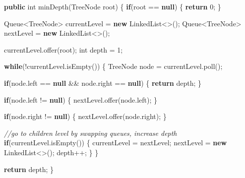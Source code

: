 \documentclass[]{book}
\newenvironment{Shaded}{\begin{snugshade}}{\end{snugshade}}
\newcommand{\BuiltInTok}[1]{#1}
\newcommand{\CommentTok}[1]{\textcolor[rgb]{0.56,0.35,0.01}{\textit{#1}}}
\newcommand{\DataTypeTok}[1]{\textcolor[rgb]{0.13,0.29,0.53}{#1}}
\newcommand{\DecValTok}[1]{\textcolor[rgb]{0.00,0.00,0.81}{#1}}
\newcommand{\FunctionTok}[1]{\textcolor[rgb]{0.00,0.00,0.00}{#1}}
\newcommand{\KeywordTok}[1]{\textcolor[rgb]{0.13,0.29,0.53}{\textbf{#1}}}
\newcommand{\NormalTok}[1]{#1}
\begin{document}
\begin{Shaded}
\begin{Highlighting}[]
\KeywordTok{public} \DataTypeTok{int} \FunctionTok{minDepth}\NormalTok{(}\BuiltInTok{TreeNode}\NormalTok{ root) \{}
    \KeywordTok{if}\NormalTok{(root == }\KeywordTok{null}\NormalTok{) \{}
        \KeywordTok{return} \DecValTok{0}\NormalTok{;}
\NormalTok{    \}}

    \BuiltInTok{Queue}\NormalTok{<}\BuiltInTok{TreeNode}\NormalTok{> currentLevel = }\KeywordTok{new} \BuiltInTok{LinkedList}\NormalTok{<>();}
    \BuiltInTok{Queue}\NormalTok{<}\BuiltInTok{TreeNode}\NormalTok{> nextLevel = }\KeywordTok{new} \BuiltInTok{LinkedList}\NormalTok{<>();}

\NormalTok{    currentLevel.}\FunctionTok{offer}\NormalTok{(root);}
    \DataTypeTok{int}\NormalTok{ depth = }\DecValTok{1}\NormalTok{;}

    \KeywordTok{while}\NormalTok{(!currentLevel.}\FunctionTok{isEmpty}\NormalTok{()) \{}
        \BuiltInTok{TreeNode}\NormalTok{ node = currentLevel.}\FunctionTok{poll}\NormalTok{();}

        \KeywordTok{if}\NormalTok{(node.}\FunctionTok{left}\NormalTok{ == }\KeywordTok{null}\NormalTok{ && node.}\FunctionTok{right}\NormalTok{ == }\KeywordTok{null}\NormalTok{) \{}
            \KeywordTok{return}\NormalTok{ depth;}
\NormalTok{        \}}

        \KeywordTok{if}\NormalTok{(node.}\FunctionTok{left}\NormalTok{ != }\KeywordTok{null}\NormalTok{) \{}
\NormalTok{            nextLevel.}\FunctionTok{offer}\NormalTok{(node.}\FunctionTok{left}\NormalTok{);}
\NormalTok{        \}}

        \KeywordTok{if}\NormalTok{(node.}\FunctionTok{right}\NormalTok{ != }\KeywordTok{null}\NormalTok{) \{}
\NormalTok{            nextLevel.}\FunctionTok{offer}\NormalTok{(node.}\FunctionTok{right}\NormalTok{);}
\NormalTok{        \}}

        \CommentTok{//go to children level by swapping queues, increase depth}
        \KeywordTok{if}\NormalTok{(currentLevel.}\FunctionTok{isEmpty}\NormalTok{()) \{}
\NormalTok{            currentLevel = nextLevel;}
\NormalTok{            nextLevel = }\KeywordTok{new} \BuiltInTok{LinkedList}\NormalTok{<>();}
\NormalTok{            depth++;}
\NormalTok{        \}}
\NormalTok{    \}}

    \KeywordTok{return}\NormalTok{ depth;}
\NormalTok{\}}
\end{Highlighting}
\end{Shaded}
\end{document}
